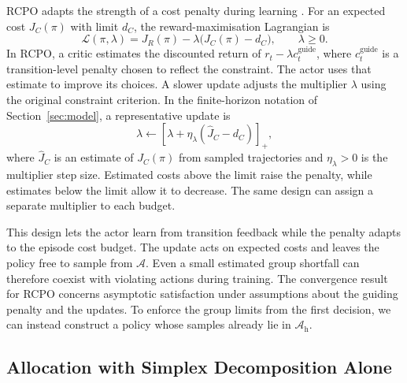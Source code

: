 \documentclass[10pt]{article}
\begin{document}
RCPO adapts the strength of a cost penalty during learning \citep{tessler2019}. For an expected cost $J_C(\pi)$ with limit $d_C$, the reward-maximisation Lagrangian is
\begin{equation}
  \mathcal L(\pi,\lambda)
    =J_R(\pi)-\lambda\bigl(J_C(\pi)-d_C\bigr),
  \qquad \lambda\geq0.
  \label{eq:lagrangian}
\end{equation}
In RCPO, a critic estimates the discounted return of $r_t-\lambda c_t^{\mathrm{guide}}$, where $c_t^{\mathrm{guide}}$ is a transition-level penalty chosen to reflect the constraint. The actor uses that estimate to improve its choices. A slower update adjusts the multiplier $\lambda$ using the original constraint criterion. In the finite-horizon notation of Section~\ref{sec:model}, a representative update is
\begin{equation}
  \lambda\leftarrow
    [\lambda+\eta_\lambda(\widehat J_C-d_C)]_+,
  \label{eq:rcpo-background-update}
\end{equation}
where $\widehat J_C$ is an estimate of $J_C(\pi)$ from sampled trajectories and $\eta_\lambda>0$ is the multiplier step size. Estimated costs above the limit raise the penalty, while estimates below the limit allow it to decrease. The same design can assign a separate multiplier to each budget.

This design lets the actor learn from transition feedback while the penalty adapts to the episode cost budget. The update acts on expected costs and leaves the policy free to sample from $\mathcal A$. Even a small estimated group shortfall can therefore coexist with violating actions during training. The convergence result for RCPO concerns asymptotic satisfaction under assumptions about the guiding penalty and the updates. To enforce the group limits from the first decision, we can instead construct a policy whose samples already lie in $\mathcal A_{\mathrm h}$.

\subsection{Allocation with Simplex Decomposition Alone}
\end{document}
